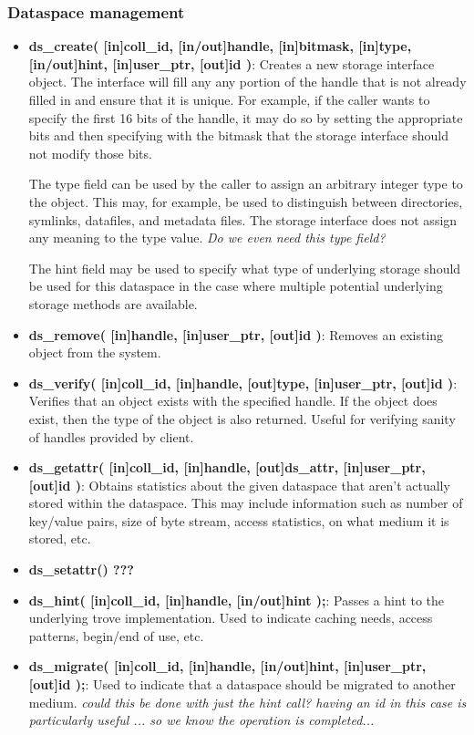 \documentclass[10pt]{article} %
\begin{document}
\subsubsection{Dataspace management}
\begin{itemize}
\item \textbf{ds\_create(
[in]coll\_id,
[in/out]handle,
[in]bitmask, 
[in]type,
[in/out]hint,
[in]user\_ptr,
[out]id
)}:
Creates a new storage interface object.  The interface will
fill any any portion of the handle that is not already filled in and
ensure that it is unique.  For example, if the caller wants to
specify the first 16 bits of the handle, it may do so by setting the
appropriate bits and then specifying with the bitmask that the storage
interface should not modify those bits.  

The type field can be used by the caller to assign an arbitrary integer
type to the object.  This may, for example, be used to distinguish
between directories, symlinks, datafiles, and metadata files.  The storage
interface does not assign any meaning to the type value. \emph{Do we even need
this type field?}

The hint field may be used to specify what type of underlying storage
should be used for this dataspace in the case where multiple potential
underlying storage methods are available.

\item \textbf{ds\_remove(
[in]handle, 
[in]user\_ptr,
[out]id
)}:
Removes an existing object from the system.

\item \textbf{ds\_verify(
[in]coll\_id,
[in]handle,
[out]type,
[in]user\_ptr,
[out]id
)}:
Verifies that an object exists with the specified handle.  If the object
does exist, then the type of the object is also returned.  Useful for
verifying sanity of handles provided by client.

\item \textbf{ds\_getattr(
[in]coll\_id,
[in]handle,
[out]ds\_attr,
[in]user\_ptr,
[out]id
)}:
Obtains statistics about the given dataspace that aren't actually stored
within the dataspace.  This may include information such as number of
key/value pairs, size of byte stream, access statistics, on what medium
it is stored, etc.

\item \textbf{ds\_setattr() ???}

\item \textbf{ds\_hint(
[in]coll\_id,
[in]handle,
[in/out]hint
);}:
Passes a hint to the underlying trove implementation.  Used to indicate
caching needs, access patterns, begin/end of use, etc.

\item \textbf{ds\_migrate(
[in]coll\_id,
[in]handle,
[in/out]hint,
[in]user\_ptr,
[out]id
);}:
Used to indicate that a dataspace should be migrated to another medium.
\emph{could this be done with just the hint call?  having an id in this case
is particularly useful ... so we know the operation is completed...}
\end{itemize}
\end{document}
